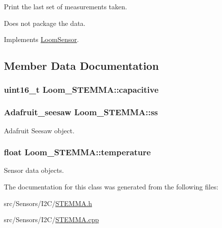 Print the last set of measurements taken. 

Does not package the data. 

Implements \hyperlink{class_loom_sensor_aba2aa35441c2eb1cf27b95a1fc08b288}{Loom\+Sensor}.



\subsection{Member Data Documentation}
\subsubsection[{\texorpdfstring{capacitive}{capacitive}}]{\setlength{\rightskip}{0pt plus 5cm}uint16\+\_\+t Loom\+\_\+\+S\+T\+E\+M\+M\+A\+::capacitive\hspace{0.3cm}{\ttfamily [protected]}}\hypertarget{class_loom___s_t_e_m_m_a_a9bc07affd7f811ccd9ec562d78e24ee6}{}\label{class_loom___s_t_e_m_m_a_a9bc07affd7f811ccd9ec562d78e24ee6}
\subsubsection[{\texorpdfstring{ss}{ss}}]{\setlength{\rightskip}{0pt plus 5cm}Adafruit\+\_\+seesaw Loom\+\_\+\+S\+T\+E\+M\+M\+A\+::ss\hspace{0.3cm}{\ttfamily [protected]}}\hypertarget{class_loom___s_t_e_m_m_a_afaef66b72da7983be590ca9fd8e8a43b}{}\label{class_loom___s_t_e_m_m_a_afaef66b72da7983be590ca9fd8e8a43b}


Adafruit Seesaw object. 

\subsubsection[{\texorpdfstring{temperature}{temperature}}]{\setlength{\rightskip}{0pt plus 5cm}float Loom\+\_\+\+S\+T\+E\+M\+M\+A\+::temperature\hspace{0.3cm}{\ttfamily [protected]}}\hypertarget{class_loom___s_t_e_m_m_a_a71c6cb89007396bb88f265ad70b998b0}{}\label{class_loom___s_t_e_m_m_a_a71c6cb89007396bb88f265ad70b998b0}


Sensor data objects. 



The documentation for this class was generated from the following files\+:\begin{DoxyCompactItemize}
\item 
src/\+Sensors/\+I2\+C/\hyperlink{_s_t_e_m_m_a_8h}{S\+T\+E\+M\+M\+A.\+h}\item 
src/\+Sensors/\+I2\+C/\hyperlink{_s_t_e_m_m_a_8cpp}{S\+T\+E\+M\+M\+A.\+cpp}\end{DoxyCompactItemize}
